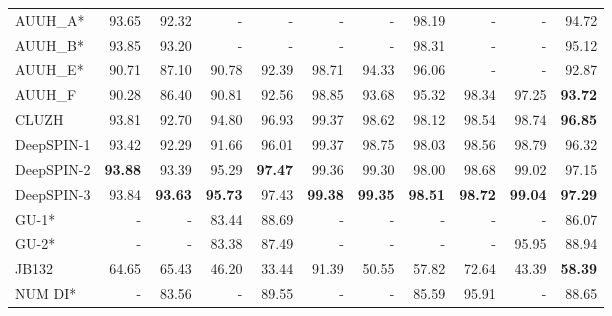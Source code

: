 \documentclass[11pt]{article}
\begin{document}
\begin{table*}[t]
\begin{tabularx}{\textwidth}{l|RRRRRRRRR|R}
\hline
\hline
AUUH\_A*    & 93.65          & 92.32          & -              & -              & -              & -              & 98.19          & -              & -              & 94.72          \\
AUUH\_B*    & 93.85          & 93.20          & -              & -              & -              & -              & 98.31          & -              & -              & 95.12          \\
AUUH\_E*   & 90.71          & 87.10          & 90.78          & 92.39          & 98.71          & 94.33          & 96.06          & -              & -              & 92.87          \\
AUUH\_F    & 90.28          & 86.40          & 90.81          & 92.56          & 98.85          & 93.68          & 95.32          & 98.34          & 97.25          & \textbf{93.72} \\
\hline
\hline
CLUZH   & 93.81          & 92.70          & 94.80          & 96.93          & 99.37          & 98.62          & 98.12          & 98.54          & 98.74          & \textbf{96.85} \\
\hline
\hline
DeepSPIN-1 & 93.42          & 92.29          & 91.66          & 96.01          & 99.37          & 98.75          & 98.03          & 98.56          & 98.79          & 96.32          \\
DeepSPIN-2 & \textbf{93.88} & 93.39          & 95.29          & \textbf{97.47} & 99.36          & 99.30          & 98.00          & 98.68          & 99.02          & 97.15          \\
DeepSPIN-3 & 93.84          & \textbf{93.63} & \textbf{95.73} & 97.43          & \textbf{99.38} & \textbf{99.35} & \textbf{98.51} & \textbf{98.72} & \textbf{99.04} & \textbf{97.29} \\
\hline
\hline
GU-1*      & -              & -              & 83.44          & 88.69          & -              & -              & -              & -              & -              & 86.07          \\
GU-2*     & -              & -              & 83.38          & 87.49          & -              & -              & -              & -              & 95.95          & 88.94          \\
\hline
\hline
JB132      & 64.65          & 65.43          & 46.20          & 33.44          & 91.39          & 50.55          & 57.82          & 72.64          & 43.39          & \textbf{58.39} \\
\hline
\hline
NUM DI*     & -          & 83.56          & -              & 89.55          & -              & -              & 85.59          & 95.91          & -              & 88.65         \\

\end{tabularx}
\end{table*}
\end{document}
